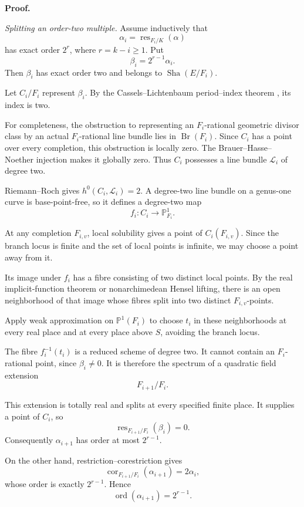 \documentclass[11pt]{article}
\newcommand{\Sha}{\mathop{\mathrm{Sha}}\nolimits}
\begin{document}
\medskip
\noindent\textbf{Proof.}

\emph{Splitting an order-two multiple.}
Assume inductively that
\[
\alpha_i=\operatorname{res}_{F_i/K}(\alpha)
\]
has exact order $2^r$, where $r=k-i\ge1$.
Put
\[
\beta_i=2^{r-1}\alpha_i.
\]
Then $\beta_i$ has exact order two and belongs
to $\Sha(E/F_i)$.

Let $C_i/F_i$ represent $\beta_i$. By the
Cassels--Lichtenbaum period--index theorem
\cite[Theorem 2.7(ii)]{FisherVisibility}, its
index is two.

For completeness, the obstruction to representing
an $F_i$-rational geometric divisor class by an
actual $F_i$-rational line bundle lies in
$\operatorname{Br}(F_i)$. Since $C_i$ has a point
over every completion, this obstruction is locally
zero. The Brauer--Hasse--Noether injection makes
it globally zero. Thus $C_i$ possesses a line
bundle $\mathcal L_i$ of degree two.

Riemann--Roch gives $h^0(C_i,\mathcal L_i)=2$.
A degree-two line bundle on a genus-one curve is
base-point-free, so it defines a degree-two map
\[
f_i:C_i\longrightarrow\mathbb P^1_{F_i}.
\]

At any completion $F_{i,v}$, local solubility
gives a point of $C_i(F_{i,v})$. Since the branch
locus is finite and the set of local points is
infinite, we may choose a point away from it.

Its image under $f_i$ has a fibre consisting
of two distinct local points. By the real
implicit-function theorem or nonarchimedean
Hensel lifting, there is an open neighborhood
of that image whose fibres split into two
distinct $F_{i,v}$-points.

Apply weak approximation on $\mathbb P^1(F_i)$
to choose $t_i$ in these neighborhoods at every
real place and at every place above $S$, avoiding
the branch locus.

The fibre $f_i^{-1}(t_i)$ is a reduced scheme
of degree two. It cannot contain an
$F_i$-rational point, since $\beta_i\ne0$.
It is therefore the spectrum of a quadratic
field extension
\[
F_{i+1}/F_i.
\]

This extension is totally real and splits at
every specified finite place. It supplies a
point of $C_i$, so
\[
\operatorname{res}_{F_{i+1}/F_i}(\beta_i)=0.
\]
Consequently $\alpha_{i+1}$ has order at most
$2^{r-1}$.

On the other hand, restriction--corestriction
gives
\[
\operatorname{cor}_{F_{i+1}/F_i}(\alpha_{i+1})
=2\alpha_i,
\]
whose order is exactly $2^{r-1}$. Hence
\[
\operatorname{ord}(\alpha_{i+1})=2^{r-1}.
\]
\end{document}
